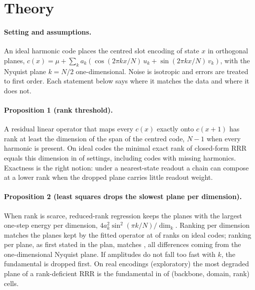 \section{Theory}\label{app:theory}
\paragraph{Setting and assumptions.}
An ideal harmonic code places the centred slot encoding of state $x$ in orthogonal planes, $c(x) = \mu + \sum_k a_k
(\cos(2\pi k x/N)\,u_k + \sin(2\pi k x/N)\,v_k)$, with the Nyquist plane $k=N/2$ one-dimensional. Noise is isotropic and
errors are treated to first order. Each statement below says where it matches the data and where it does not.

\paragraph{Proposition 1 (rank threshold).} A residual linear operator that maps every $c(x)$ exactly onto $c(x+1)$ has rank at least
the dimension of the span of the centred code, $N-1$ when every harmonic is present. On ideal codes the minimal exact rank of
closed-form RRR equals this dimension in \CLtheoryPoneHolds{} of \CLtheoryPoneCases{} settings, including codes with missing
harmonics. Exactness is the right notion: under a nearest-state readout a chain can compose at a lower rank when the dropped plane
carries little readout weight. 

\paragraph{Proposition 2 (least squares drops the slowest plane per dimension).} When rank is scarce, reduced-rank regression keeps
the planes with the largest one-step energy per dimension, $4a_k^2\sin^2(\pi k/N)/\dim_k$. Ranking per dimension matches the planes kept
by the fitted operator at \CLtheoryPtwoDim{} of \CLtheoryPtwoRanks{} ranks on ideal codes; ranking per plane, as first stated in the
plan, matches \CLtheoryPtwoPlane{}, all differences coming from the one-dimensional Nyquist plane. If amplitudes do not fall too fast
with $k$, the fundamental is dropped first. On real encodings (exploratory) the most degraded plane of a rank-deficient RRR is the
fundamental in \CLtheoryTtwoAWorst{} of \CLtheoryTtwoARanks{} (backbone, domain, rank) cells. 

